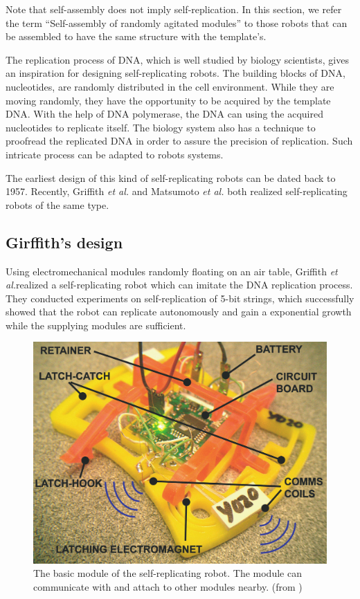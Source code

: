 \documentclass[12pt,twoside]{article}
\theoremstyle{plain}
\theoremstyle{definition}
\theoremstyle{remark}
\newcommand{\etal}{\textit{et al.}}
\begin{document}
Note that self-assembly does not imply self-replication. In this section, we refer the term ``Self-assembly of randomly agitated modules'' to those robots that can be assembled to have the same structure with the template's. 

The replication process of DNA, which is well studied by biology scientists, gives an inspiration for designing self-replicating robots. The building blocks of DNA, nucleotides, are randomly distributed in the cell environment. While they are moving randomly, they have the opportunity to be acquired by the template DNA. With the help of DNA polymerase, the DNA can using the acquired nucleotides to replicate itself. The biology system also has a technique to proofread the replicated DNA in order to assure the precision of replication\cite{alberts_molecular_2002}. Such intricate process can be adapted to robots systems.

The earliest design of this kind of self-replicating robots can be dated back to 1957\cite{penrose_self-reproducing_1957}. Recently, Griffith \etal \cite{griffith_self-replication_2005} and Matsumoto \etal \cite{matsumoto_passive_2009} both realized self-replicating robots of the same type.

\subsection{Girffith's design}
Using electromechanical modules randomly floating on an air table, Griffith \etal realized a self-replicating robot which can imitate the DNA replication process\cite{griffith_growing_2004}\cite{griffith_self-replication_2005}. They conducted experiments on self-replication of 5-bit strings, which successfully showed that the robot can replicate autonomously and gain a exponential growth while the supplying modules are sufficient.

\begin{figure}[t]
	 \centerline{\includegraphics[width=.4\textwidth]{griffith-000}}
	 {\caption{The basic module of the self-replicating robot. The module can communicate with and attach to other modules nearby. (from \cite{griffith_growing_2004})}
	 \label{fig:gri-unit}}
\end{figure}
\end{document}
